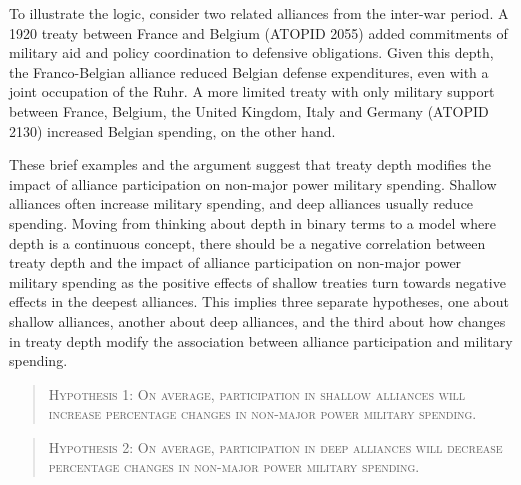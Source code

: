 \documentclass[12pt]{article}
\begin{document}


To illustrate the logic, consider two related alliances from the inter-war period. 
A 1920 treaty between France and Belgium (ATOPID 2055) added commitments of military aid and policy coordination to defensive obligations. 
Given this depth, the Franco-Belgian alliance reduced Belgian defense expenditures, even with a joint occupation of the Ruhr. 
A more limited treaty with only military support between France, Belgium, the United Kingdom, Italy and Germany (ATOPID 2130) increased Belgian spending, on the other hand.   
 
 
These brief examples and the argument suggest that treaty depth modifies the impact of alliance participation on non-major power military spending. 
Shallow alliances often increase military spending, and deep alliances usually reduce spending.  
Moving from thinking about depth in binary terms to a model where depth is a continuous concept, there should be a negative correlation between treaty depth and the impact of alliance participation on non-major power military spending as the positive effects of shallow treaties turn towards negative effects in the deepest alliances. 
This implies three separate hypotheses, one about shallow alliances, another about deep alliances, and the third about how changes in treaty depth modify the association between alliance participation and military spending. 
 

\begin{quote}
\textsc{Hypothesis 1: On average, participation in shallow alliances will increase percentage changes in non-major power military spending.}
\end{quote}

\begin{quote}
\textsc{Hypothesis 2: On average, participation in deep alliances will decrease percentage changes in non-major power military spending.}
\end{quote}
\end{document}
